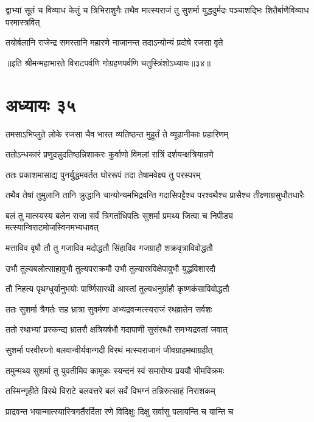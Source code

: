 \threelineshloka
{द्वाभ्यां सूतं च विव्याध केतुं च त्रिभिराशुगैः}
{तथैव मात्स्यराजं तु सुशर्मा युद्धदुर्मदः}
{पञ्चाशद्भिः शितैर्बाणैविव्याध परमास्त्रवित्}


\twolineshloka
{तयोर्बलानि राजेन्द्र समस्तानि महारणे}
{नाजानन्त तदाऽन्योन्यं प्रदोषे रजसा वृते}

॥इति श्रीमन्महाभारते विराटपर्वणि गोग्रहणपर्वणि चतुस्त्रिंशोऽध्यायः॥३४॥

\chapter{अध्यायः ३५}

\twolineshloka
{तमसाऽभिप्लुते लोके रजसा चैव भारत}
{व्यतिष्ठन्त मुहूर्तं ते व्यूढानीकाः प्रहारिणम्}


\twolineshloka
{ततोऽन्धकारं प्रणुदन्नुदतिष्ठन्निशाकरः}
{कुर्वाणो विमलां रात्रिं दर्शयन्क्षत्रियान्रणे}


\twolineshloka
{ततः प्रकाशमासाद्य पुनर्युद्धमवर्तत}
{घोररूपं तदा तेषामवेक्ष्य तु परस्परम्}


\twolineshloka
{तथैव तेषां तुमुलानि तानि क्रुद्धानि चान्योन्यमभिद्रवन्ति}
{गदासिपट्टैश्च परश्वथैश्च प्रासैश्च तीक्ष्णाग्रसुधौतधारैः}


\twolineshloka
{बलं तु मात्स्यस्य बलेन राजा सर्वं त्रिगर्ताधिपतिः सुशर्मा}
{प्रमथ्य जित्वा च निपीड्य मत्स्यान्विराटमोजस्विनमभ्यधावत्}


\twolineshloka
{मत्ताविव वृषौ तौ तु गजाविव मदोद्धतौ}
{सिंहाविव गजग्राहौ शक्रवृत्राविवोद्धतौ}


\twolineshloka
{उभौ तुल्यबलोत्साहावुभौ तुल्यपराक्रमौ}
{उभौ तुल्यास्रविक्षेपावुभौ युद्धविशारदौ}


\twolineshloka
{तौ निहत्य पृथग्धुर्यानुभयोः पार्ष्णिसारथी}
{आस्तां तुल्यधनुर्ग्राहौ कृष्णकंसाविवोद्धतौ}


\twolineshloka
{ततः सुशर्मा त्रैगर्तः सह भ्रात्रा सुवर्मणा}
{अभ्यद्रवन्मत्स्यराजं रथव्रातेन सर्वशः}


\twolineshloka
{ततो रथाभ्यां प्रस्कन्द्य भ्रातरौ क्षत्रियर्षभौ}
{गदापाणी सुसंरब्धौ समभ्यद्रवतां जवात्}


\twolineshloka
{सुशर्मा परवीरघ्नो बलवान्वीर्यवान्गदी}
{विरथं मत्स्यराजानं जीवग्राहमथाग्रहीत्}


\twolineshloka
{तमुन्मथ्य सुशर्मा तु युवतीमिव कामुकः}
{स्यन्दनं स्वं समारोप्य प्रययौ भीमविक्रमः}


\twolineshloka
{तस्मिन्गृहीते विरथे विराटे बलवत्तरे}
{बलं सर्वं विभग्नं तन्निरुत्साहं निराशकम्}


\twolineshloka
{प्राद्रवन्त भयान्मात्स्यास्त्रिगर्तैरर्दिता रणे}
{विदिक्षुः दिक्षु सर्वासु पलायन्ति च यान्ति च}


